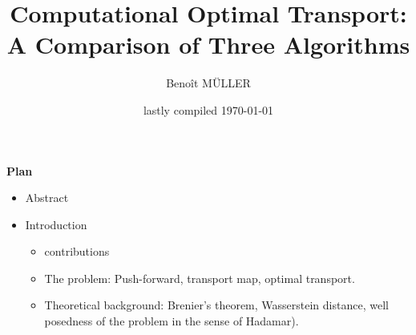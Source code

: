 \documentclass[a4paper]{article}
\title{ \Huge Computational Optimal Transport:\\ A Comparison of Three Algorithms}
\author{Benoît MÜLLER}
\date{lastly compiled \today}
\theoremstyle{definition}
\theoremstyle{remark}
\begin{document}
\maketitle
\begin{center}
    \Huge \bf{Plan}
\end{center}
\begin{itemize}
    \item Abstract
    \item Introduction
    \begin{itemize}
        \item contributions
        \item The problem: Push-forward, transport map, optimal transport.
        \item Theoretical background: Brenier's theorem, Wasserstein distance, well posedness of the problem in the sense of Hadamar).
    \end{itemize}
\end{itemize}
\end{document}
